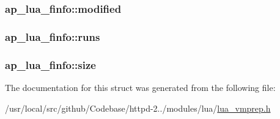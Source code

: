 \subsubsection[{\texorpdfstring{modified}{modified}}]{ ap\+\_\+lua\+\_\+finfo\+::modified}\hypertarget{structap__lua__finfo_a437d7d7c91addc2a66eb54b1a1799e41}{}\label{structap__lua__finfo_a437d7d7c91addc2a66eb54b1a1799e41}
\subsubsection[{\texorpdfstring{runs}{runs}}]{ ap\+\_\+lua\+\_\+finfo\+::runs}\hypertarget{structap__lua__finfo_a579b5cb9299631a471316e8edda02dd7}{}\label{structap__lua__finfo_a579b5cb9299631a471316e8edda02dd7}
\subsubsection[{\texorpdfstring{size}{size}}]{ ap\+\_\+lua\+\_\+finfo\+::size}\hypertarget{structap__lua__finfo_a6b961c0cc6d0b56637da657c03819457}{}\label{structap__lua__finfo_a6b961c0cc6d0b56637da657c03819457}


The documentation for this struct was generated from the following file\+:\begin{DoxyCompactItemize}
\item 
/usr/local/src/github/\+Codebase/httpd-\/2../modules/lua/\hyperlink{lua__vmprep_8h}{lua\+\_\+vmprep.\+h}\end{DoxyCompactItemize}
